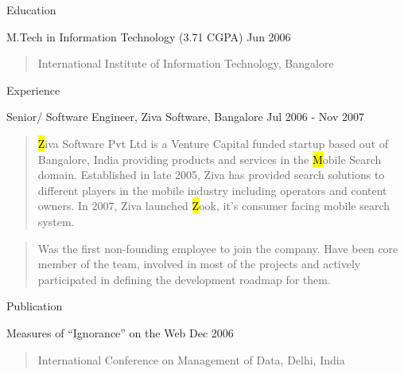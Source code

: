 \documentclass{resume}
\author{Siddhartha Reddy Kothakapu}
\begin{document}
 \maketitle

\begin{category}{Education}{}

    \item {\topic M.Tech in Information Technology}
        {\footnotesize(3.71 CGPA)}
        {\period Jun 2006}
        \begin{quote}
            International Institute of Information Technology, Bangalore
        \end{quote}

\end{category}


\begin{category}{Experience}{}

    \item {\topic Senior/ Software Engineer,} Ziva Software, Bangalore
        {\period Jul 2006 - Nov 2007}
        \begin{quotation}
            {\hl Ziva Software Pvt Ltd} is a Venture Capital funded startup based
            out of Bangalore, India providing products and services in the {\hl
            Mobile Search} domain. Established in late 2005, Ziva has provided
            search solutions to different players in the mobile industry including
            operators and content owners. In 2007, Ziva launched {\hl Zook}, it's
            consumer facing mobile search system.
        \end{quotation}
        \begin{quotation}
            Was the first non-founding employee to join the company. Have been core
            member of the team, involved in most of the projects and actively
            participated in defining the development roadmap for them.
        \end{quotation}

\end{category}


\begin{category}{Publication}{}

    \item {\topic Measures of ``Ignorance'' on the Web}
        {\period Dec 2006}
        \begin{quote}
            International Conference on Management of Data, Delhi, India
        \end{quote}

\end{category}
\end{document}
